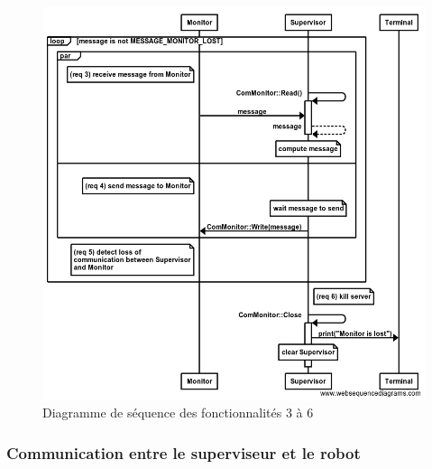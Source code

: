 \begin{figure}[htbp]
\begin{center}
\includegraphics[scale=0.4]{./seq_req/req3-6}
\caption{Diagramme de séquence des fonctionnalités 3 à 6}
\label{fig:diag3_6}
\end{center}
\end{figure}
\FloatBarrier

\subsubsection{Communication entre le superviseur et le robot}

